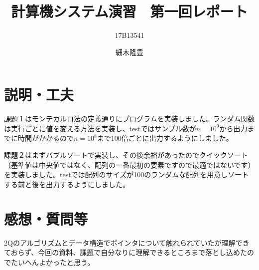 \documentclass{jarticle}
\title{計算機システム演習　第一回レポート}
\author{17B13541 \and 細木隆豊}
\date{}
\begin{document}
  \maketitle

  \section{説明・工夫}
  課題１はモンテカルロ法の定義通りにプログラムを実装しました。ランダム関数は実行ごとに値を変える方法を実装し、testではサンプル数が$n=10^9$から出力までに時間がかかるので$n=10^8$まで100倍ごとに出力するようにしました。

  課題２はまずバブルソートで実装し、その後余裕があったのでクイックソート（基準値は中央値ではなく、配列の一番最初の要素ですので最適ではないです）を実装しました。testでは配列のサイズが100のランダムな配列を用意しソートする前と後を出力するようにしました。
  \section{感想・質問等}
  2Qのアルゴリズムとデータ構造でポインタについて触れられていたが理解できておらず、今回の資料、課題で自分なりに理解できるところまで落とし込めたのでたいへんよかったと思う。
\end{document}
